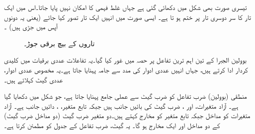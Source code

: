  تیسری صورت بھی شکل میں دکھائی گئی ہے جہاں غلط فہمی کا امکان نہیں پایا جاتا۔اس میں ایک تار کا سر دوسری تار پر ختم ہو تا ہے۔ ایسی صورت میں انہیں ایک تار تصور کیا جائے (یعنی یہ دونوں آپس میں جڑی ہیں) ۔
\begin{figure}
\centering
{}\quad\quad
{}\quad \quad 
{}
\caption{تاروں کے بیچ برقی جوڑ۔}
\label{شکل_بوولین_برقی_تار_جوڑ}
\end{figure}

 بوولین الجبرا کے تین اہم ترین تفاعل پر حصہ  میں غور کیا گیا۔یہ تفاعلات عددی برقیات میں کلیدی کردار ادا کرتے ہیں، جہاں انہیں عددی ادوار کی مدد سے جامہ پہنایا جاتا ہے۔یہ مخصوص عددی ادوار، عددی گیٹ کہلاتے ہیں۔
 
منطقی (بوولین) ضرب تفاعل کو ضرب گیٹ سے عملی جامع پہنایا جاتا ہے، جو شکل  میں دکھایا گیا ہے۔ آزاد متغیرات،  اور ، ضرب گیٹ کی بائیں جانب ہیں جبکہ تابع متغیر، ، دائیں جانب ہے۔ آزاد متغیرات کو مداخل جبکہ تابع متغیر کو مخارج کہتے ہیں۔دو متغیر ضرب گیٹ (دو مداخل ضرب گیٹ) کے دو مداخل اور ایک مخارج ہو گا۔ یہ گیٹ، ضرب تفاعل کے جدول کو مطمئن کرتا ہے۔
	
